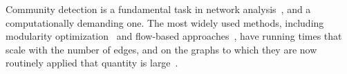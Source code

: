 
Community detection is a fundamental task in network
analysis~\cite{fortunato2010community, fortunato202220}, and a computationally
demanding one. The most widely used methods, including modularity
optimization~\cite{newman2004finding, blondel2008fast, traag2019louvain} and
flow-based approaches~\cite{rosvall2008maps}, have running times that scale with
the number of edges, and on the graphs to which they are now routinely applied
that quantity is large~\cite{leskovec2009community}.

